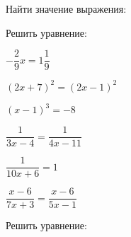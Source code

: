 \begin{listofex}
\begin{enumcols}[itemcolumns=2, start=3]
	\end{enumcols}
	\item Найти значение выражения:
	\begin{enumcols}[itemcolumns=1]
		\item {}
		\item {}
		\item {}
	\end{enumcols}
	\newpage
	\item Решить уравнение:
	\begin{enumcols}[itemcolumns=2]
		\item \( -\dfrac{2}{9}x=1\dfrac{1}{9} \)
		\item \( (2x+7)^2=(2x-1)^2 \)
		\item \( (x-1)^3=-8 \)
		\item {}
		\item {}
		\item \( \dfrac{1}{3x-4}=\dfrac{1}{4x-11} \)
		\item \( \dfrac{1}{10x+6}=1 \)
		\item \( \dfrac{x-6}{7x+3}=\dfrac{x-6}{5x-1} \)
	\end{enumcols}
	\item Решить уравнение:
	\begin{enumcols}[itemcolumns=2]
		\item {}
		\item {}
	\end{enumcols}
\end{listofex}